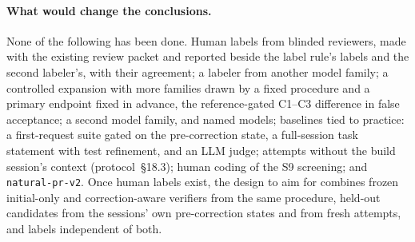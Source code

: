 \paragraph{What would change the conclusions.} None of the following has been done. Human labels from blinded reviewers, made with the existing review packet and reported beside the label rule's labels and the second labeler's, with their agreement; a labeler from another model family; a controlled expansion with more families drawn by a fixed procedure and a primary endpoint fixed in advance, the reference-gated C1--C3 difference in false acceptance; a second model family, and named models; baselines tied to practice: a first-request suite gated on the pre-correction state, a full-session task statement with test refinement, and an LLM judge; attempts without the build session's context (protocol~\S18.3); human coding of the S9 screening; and \texttt{natural-pr-v2}. Once human labels exist, the design to aim for combines frozen initial-only and correction-aware verifiers from the same procedure, held-out candidates from the sessions' own pre-correction states and from fresh attempts, and labels independent of both.
